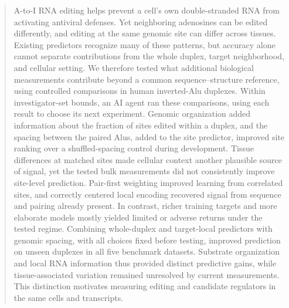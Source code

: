 \documentclass[9pt,twocolumn,twoside]{pnas-new}
\begin{document}
\begin{abstract}
A-to-I RNA editing helps prevent a cell's own double-stranded RNA from activating antiviral defenses. Yet neighboring adenosines can be edited differently, and editing at the same genomic site can differ across tissues. Existing predictors recognize many of these patterns, but accuracy alone cannot separate contributions from the whole duplex, target neighborhood, and cellular setting. We therefore tested what additional biological measurements contribute beyond a common sequence--structure reference, using controlled comparisons in human inverted-Alu duplexes. Within investigator-set bounds, an AI agent ran these comparisons, using each result to choose its next experiment. Genomic organization added information about the fraction of sites edited within a duplex, and the spacing between the paired Alus, added to the site predictor, improved site ranking over a shuffled-spacing control during development. Tissue differences at matched sites made cellular context another plausible source of signal, yet the tested bulk measurements did not consistently improve site-level prediction. Pair-first weighting improved learning from correlated sites, and correctly centered local encoding recovered signal from sequence and pairing already present. In contrast, richer training targets and more elaborate models mostly yielded limited or adverse returns under the tested regime. Combining whole-duplex and target-local predictors with genomic spacing, with all choices fixed before testing, improved prediction on unseen duplexes in all five benchmark datasets. Substrate organization and local RNA information thus provided distinct predictive gains, while tissue-associated variation remained unresolved by current measurements. This distinction motivates measuring editing and candidate regulators in the same cells and transcripts.
\end{abstract}


\maketitle
\thispagestyle{firststyle}

\Firstpage
\end{document}
